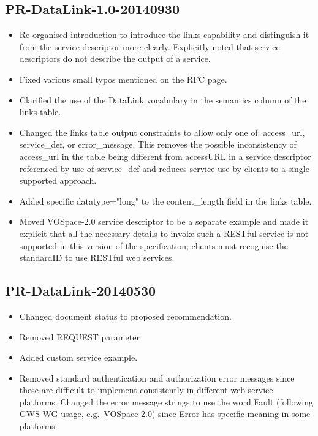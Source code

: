 \documentclass[11pt,a4paper]{ivoa}
\newcommand{\attval}[2]{#1={\allowbreak}{"}#2{"}}
\begin{document}
\subsection{PR-DataLink-1.0-20140930}

\begin{itemize}
\item
Re-organised introduction to introduce the links capability and
distinguish it from the service descriptor more clearly. Explicitly
noted that service descriptors do not describe the output of a service.
\item
Fixed various small typos mentioned on the RFC page.
\item
Clarified the use of the DataLink vocabulary in the semantics column of
the links table.
\item
Changed the links table output constraints to allow only one of:
access\_url, service\_def, or error\_message. This removes the possible
inconsistency of access\_url in the table being different from accessURL
in a service descriptor referenced by use of service\_def and reduces
service use by clients to a single supported approach.
\item
Added specific \attval{datatype}{long} to the content\_length field in the
links table.
\item
Moved VOSpace-2.0 service descriptor to be a separate example and made
it explicit that all the necessary details to invoke such a RESTful
service is not supported in this version of the specification; clients
must recognise the standardID to use RESTful web services.
\end{itemize}


\subsection{PR-DataLink-20140530}

\begin{itemize}
\item
Changed document status to proposed recommendation.
\item
Removed REQUEST parameter
\item
Added custom service example.
\item
Removed standard authentication and authorization error messages since
these are difficult to implement consistently in different web service
platforms. Changed the error message strings to use the word Fault
(following GWS-WG usage, e.g.\ VOSpace-2.0) since Error has specific
meaning in some platforms.
\end{itemize}
\end{document}
